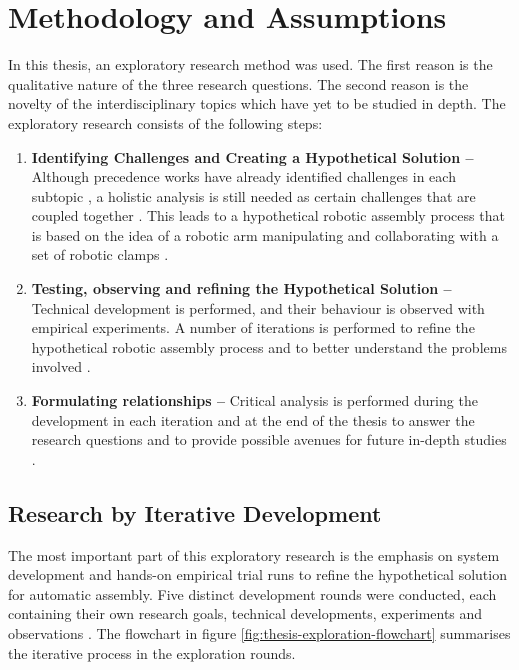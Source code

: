 \chapter{Methodology and Assumptions}
\label{chapter:methodology-and-assumptions}

In this thesis, an exploratory research method was used. The first reason is the qualitative nature of the three research questions. The second reason is the novelty of the interdisciplinary topics which have yet to be studied in depth. The exploratory research consists of the following steps:

\begin{enumerate}
	\item \textbf{Identifying Challenges and Creating a Hypothetical Solution --} Although precedence works have already identified challenges in each subtopic , a holistic analysis is still needed as certain challenges that are coupled together . This leads to a hypothetical robotic assembly process that is based on the idea of a robotic arm manipulating and collaborating with a set of robotic clamps .

	\item \textbf{Testing, observing and refining the Hypothetical Solution --} Technical development is performed, and their behaviour is observed with empirical experiments. A number of iterations is performed to refine the hypothetical robotic assembly process and to better understand the problems involved .

	\item \textbf{Formulating relationships --} Critical analysis is performed during the development in each iteration and at the end of the thesis to answer the research questions and to provide possible avenues for future in-depth studies .

\end{enumerate}
\section{Research by Iterative Development}
\label{section:methodology-research-by-iterative-development}

The most important part of this exploratory research is the emphasis on system development and hands-on empirical trial runs to refine the hypothetical solution for automatic assembly. Five distinct development rounds were conducted, each containing their own research goals, technical developments, experiments and observations . The flowchart in figure \ref{fig:thesis-exploration-flowchart} summarises the iterative process in the exploration rounds. 

